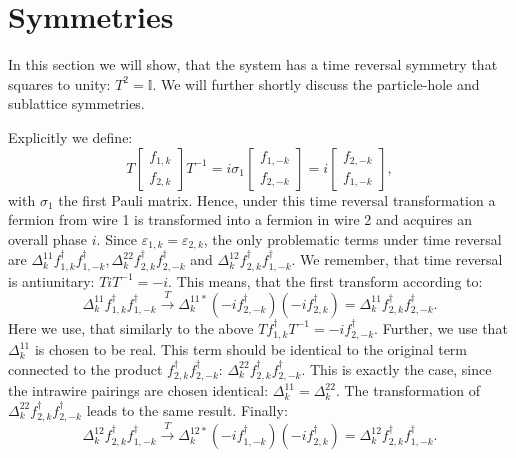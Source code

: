 \section{Symmetries}
In this section we will show, that the system has a time reversal symmetry that squares to unity: $T^2 = \mathbb{I}$. We will further shortly discuss the particle-hole and sublattice symmetries. 

Explicitly we define:
\begin{equation}
T\begin{bmatrix} f_{1,k} \\ f_{2,k} \end{bmatrix} T^{-1} = i\sigma_1 \begin{bmatrix} f_{1,-k} \\ f_{2,-k} \end{bmatrix} = i\begin{bmatrix} f_{2,-k} \\ f_{1,-k} \end{bmatrix},\nonumber
\end{equation} 
with $\sigma_1$ the first Pauli matrix. Hence, under this time reversal transformation a fermion from wire 1 is transformed into a fermion in wire 2 and acquires an overall phase $i$. Since $\varepsilon_{1,k} = \varepsilon_{2,k}$, the only problematic terms under time reversal are $\Delta^{11}_k f^\dagger_{1,k}f^\dagger_{1,-k}, \Delta^{22}_k f^\dagger_{2,k}f^\dagger_{2,-k}$ and $\Delta^{12}_kf^\dagger_{2,k}f^\dagger_{1,-k}$. We remember, that time reversal is antiunitary: $TiT^{-1} = -i$. This means, that the first transform according to:
\begin{equation}
\Delta^{11}_k f^\dagger_{1,k}f^\dagger_{1,-k} \overset{T}{\to} \Delta^{11*}_k \left(-i f^\dagger_{2,-k}\right)\left(-i f^\dagger_{2,k}\right) = \Delta^{11}_k f^\dagger_{2,k}f^\dagger_{2,-k}. \nonumber
\end{equation}
Here we use, that similarly to the above $Tf^\dagger_{1,k}T^{-1} = -i f^\dagger_{2,-k}$. Further, we use that $\Delta^{11}_k$ is chosen to be real. This term should be identical to the original term connected to the product $f^\dagger_{2,k}f^\dagger_{2,-k}$: $\Delta^{22}_k f^\dagger_{2,k}f^\dagger_{2,-k}$. This is exactly the case, since the intrawire pairings are chosen identical: $\Delta^{11}_k = \Delta^{22}_k$. The transformation of $\Delta^{22}_k f^\dagger_{2,k}f^\dagger_{2,-k}$ leads to the same result. Finally:
\begin{equation}
\Delta^{12}_k f^\dagger_{2,k}f^\dagger_{1,-k} \overset{T}{\to} \Delta^{12*}_k \left(-i f^\dagger_{1,-k}\right)\left(-i f^\dagger_{2,k}\right) = \Delta^{12}_k f^\dagger_{2,k}f^\dagger_{1,-k}. \nonumber
\end{equation}
